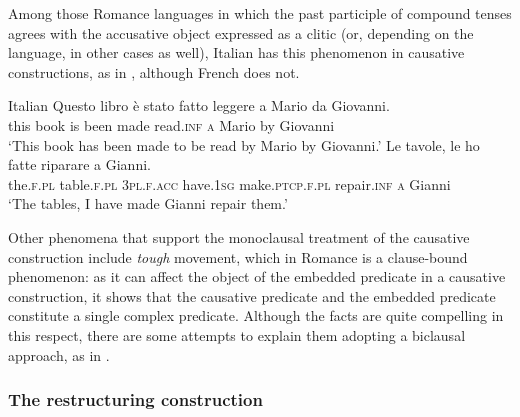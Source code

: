\documentclass[output=paper,hidelinks]{langscibook}
\begin{document}
\sloppy Among those Romance languages in which the past participle of compound ten\-ses agrees with the accusative object expressed as a clitic (or, depending on the language, in other cases as well), Italian has this phenomenon in causative constructions, as in , although French does not.
\fussy

\ea\label{ex:Romance:54}   Italian
\ea\label{ex:Romance:54a}
\gll Questo libro è stato fatto leggere a Mario da Giovanni.\\
       this book is been made read.\textsc{inf} \textsc{a} Mario by Giovanni\\
\glt   `This book has been made to be read by Mario by Giovanni.'
\ex\label{ex:Romance:54b}
\gll
 Le tavole, le ho fatte riparare a Gianni.\\
       the.\textsc{f.pl} table.\textsc{f.pl} \textsc{3pl.f.acc} have\textsc{.1sg} make\textsc{.ptcp.f.pl} repair.\textsc{inf} \textsc{a} {Gianni}\\
\glt   `The tables, I have made Gianni repair them.'\z\z

Other phenomena that support the monoclausal treatment of the causative construction include \textit{tough} movement, which in Romance is a clause-bound phenomenon: as it can affect the object of the embedded predicate in a causative construction, it shows that the causative predicate and the embedded predicate constitute a single complex predicate. Although the facts are quite compelling in this respect, there are some attempts to explain them adopting a biclausal approach, as in \citet{Yates2002}.

\subsubsection{The restructuring construction}
\label{sec:Romance:4.1.2}
\end{document}
